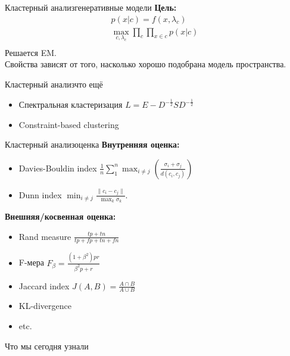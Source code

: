 \documentclass[14pt, fleqn, xcolor={dvipsnames, table}]{beamer}
\begin{document}
\begin{frame}{Кластерный анализ}{генеративные модели}
\textbf{Цель:} 
$$\begin{array}{l}
  p(x|c) = f(x, \lambda_c) \\
  \max_{c, \lambda_c}\prod_c \prod_{x\in c} p(x|c) \\
\end{array}$$
Решается EM. \\
Свойства зависят от того, насколько хорошо подобрана модель пространства. \\
\end{frame}

\begin{frame}{Кластерный анализ}{что ещё}
\begin{itemize}
  \item Спектральная кластеризация $L = E - D^{-\frac{1}{2}}SD^{-\frac{1}{2}}$
  \item Constraint-based clustering 
\end{itemize}
\end{frame}

\begin{frame}{Кластерный анализ}{оценка}
\textbf{Внутренняя оценка:}
\begin{itemize}
  \item Davies-Bouldin index $\frac{1}{n}\sum_1^n \max_{i \ne j}(\frac{\sigma_i + \sigma_j}{d(c_i, c_j)})$
  \item Dunn index $\min_{i \ne j} \frac{\|c_i - c_j\|}{\max_k \sigma_k}$.
\end{itemize}
\textbf{Внешняя/косвенная оценка:} 
\begin{itemize}
  \item Rand measure $\frac{tp+tn}{tp+fp+tn+fn}$
  \item F-мера $F_{\beta} = \frac {(1 + \beta^2)pr}{\beta^2p + r}$
  \item Jaccard index $J(A,B) = \frac{A\cap B}{A\cup B}$
  \item KL-divergence
  \item etc.
\end{itemize}
\end{frame}

\begin{frame}{Что мы сегодня узнали}
\end{frame}
\end{document}
